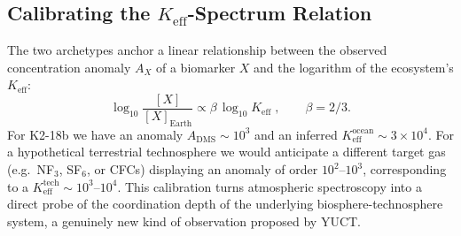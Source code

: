 \documentclass[12pt,a4paper]{article}
\begin{document}
	\subsection{Calibrating the $K_{\mathrm{eff}}$-Spectrum Relation}
	The two archetypes anchor a linear relationship between the observed
	concentration anomaly $A_X$ of a biomarker $X$ and the logarithm of
	the ecosystem's $K_{\mathrm{eff}}$:
	\begin{equation}
		\log_{10} \frac{[X]}{[X]_{\mathrm{Earth}}} \propto
		\beta\,\log_{10} K_{\mathrm{eff}} \; , \qquad \beta = 2/3 .
	\end{equation}
	For K2-18b we have an anomaly $A_{\mathrm{DMS}} \sim 10^3$ and an
	inferred $K_{\mathrm{eff}}^{\mathrm{ocean}} \sim 3\times10^4$.  For a
	hypothetical terrestrial technosphere we would anticipate a different
	target gas (e.g.\ NF$_3$, SF$_6$, or CFCs) displaying an anomaly of
	order $10^2$--$10^3$, corresponding to a $K_{\mathrm{eff}}^{\mathrm{tech}}
	\sim 10^3$--$10^4$.  This calibration turns atmospheric spectroscopy
	into a direct probe of the coordination depth of the underlying
	biosphere-technosphere system, a genuinely new kind of observation
	proposed by YUCT.
	
\end{document}
